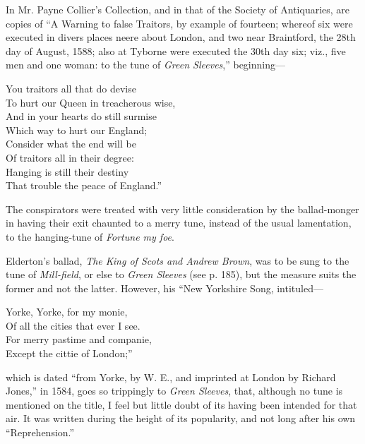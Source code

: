 In Mr. Payne Collier’s Collection, and in that of the Society of Antiquaries,
are copies of “A Warning to false Traitors, by example of fourteen; whereof six 
were executed in divers places neere about \pagebreak London, and two near Braintford, the
28th day of August, 1588; also at Tyborne were executed the 30th day six;
viz., five men and one woman: to the tune of \textit{Green Sleeves},” beginning—
\settowidth{\versewidth}{To hurt our Queen in treacherous wise,}
\begin{scverse}
\begin{patverse}
You traitors all that do devise\\
To hurt our Queen in treacherous wise,\\
And in your hearts do still surmise\\
Which way to hurt our England;\\
Consider what the end will be\\
Of traitors all in their degree:\\
Hanging is still their destiny\\
That trouble the peace of England.”
\end{patverse}
\end{scverse}

The conspirators were treated with very little consideration by the ballad-monger
in having their exit chaunted to a merry tune, instead of the usual
lamentation, to the hanging-tune of \textit{Fortune my foe}.

Elderton’s ballad, \textit{The King of Scots and Andrew Brown}, was to be sung to
the tune of \textit{Mill-field}, or else to \textit{Green Sleeves} (see p. 185), but the measure suits
the former and not the latter. However, his “New Yorkshire Song, intituled—
\settowidth{\versewidth}{For merry pastime and companie,}
\begin{scverse}
Yorke, Yorke, for my monie,\\
Of all the cities that ever I see.\\
For merry pastime and companie,\\
\vin Except the cittie of London;”
\end{scverse}
which is dated “from Yorke, by W. E., and imprinted at London by Richard
Jones,” in 1584, goes so trippingly to \textit{Green Sleeves}, that, although no tune is
mentioned on the title, I feel but little doubt of its having been intended for that
air. It was written during the height of its popularity, and not long after his
own “Reprehension.”

